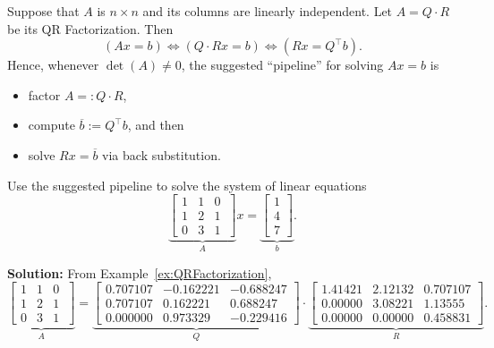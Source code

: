  
 
\vspace*{.2cm}

\begin{tcolorbox}[sharp corners, colback=green!30, colframe=green!80!blue, title=\textbf{\Large Suggested Pipeline: Solutions of Linear Equations via the QR Factorization}]
Suppose that $A$ is $n \times n$ and its columns are linearly independent. Let $A=Q \cdot R$ be its QR Factorization. Then
\begin{equation}
    \label{eq:SolvingLSviaQR}
    (Ax = b) \iff (Q \cdot Rx = b) \iff (R x = Q^\top b).
\end{equation}
Hence, whenever $\det(A) \neq 0$, the suggested ``pipeline'' for solving $Ax=b$ is
\begin{itemize}
    \item factor $A =: Q \cdot R$,
    \item compute $\overline{b}:= Q^\top b$, and then 
    \item solve $R x = \overline{b}$ via back substitution.  
\end{itemize}
\end{tcolorbox}

\begin{example}
\label{ex:QRSolveAxequalsb} Use the suggested pipeline to solve the system of linear equations
$$\underbrace{\left[ \begin{array}{ccc} 1 & 1 & 0 \
\\ 1 & 2 & 1\\
0 & 3 & 1\end{array} \right]}_{A} x =  
\underbrace{\left[ \begin{array}{c}
1 \\  4 \\  7\end{array} \right]}_{b}.$$

\end{example}

\textbf{Solution:} From Example~\ref{ex:QRFactorization}, 
$$ \underbrace{\left[ \begin{array}{ccc} 1 & 1 & 0 \
\\ 1 & 2 & 1\\
0 & 3 & 1\end{array} \right]}_{A} = \underbrace{\left[ \begin{array}{rrr} 
 0.707107 &  -0.162221  & -0.688247 \\
 0.707107  &  0.162221  & 0.688247\\
 0.000000  &       0.973329   & -0.229416
  \end{array} \right]}_{Q} \cdot 
\underbrace{\left[ \begin{array}{ccc} 
1.41421  &    2.12132    & 0.707107 \\
0.00000 & 3.08221    &   1.13555 \\
0.00000 &  0.00000 & 0.458831
  \end{array} \right]}_{R}. $$
  

